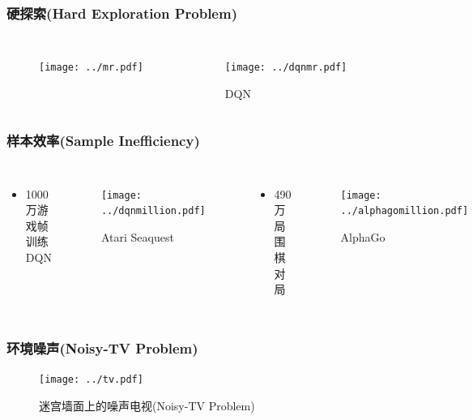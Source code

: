 \documentclass{beamer}
\begin{document}
\begin{CJK*}{GBK}{hei}
\begin{frame}\frametitle{硬探索(Hard Exploration Problem)}

\begin{columns}
    \begin{figure}[htbp]
        \centering\texttt{[image: ../mr.pdf]}
    \end{figure}
    \begin{figure}[htbp]
        \centering\texttt{[image: ../dqnmr.pdf]}
        \caption{DQN\citep{Mnih2015HumanlevelCT}}
    \end{figure}
\end{columns}
\end{frame}

\begin{frame}\frametitle{样本效率(Sample Inefficiency)}
\begin{columns}
    \begin{itemize}
        \item 1000万游戏帧训练DQN
    \end{itemize}
    \begin{figure}[htbp]
        \centering\texttt{[image: ../dqnmillion.pdf]}
	\caption{Atari Seaquest\citep{Mnih2015HumanlevelCT}}
    \end{figure}
    \begin{itemize}
        \item 490万局围棋对局
    \end{itemize}
    \begin{figure}[htbp]
        \centering\texttt{[image: ../alphagomillion.pdf]}
	\caption{AlphaGo\citep{Silver2017MasteringTG}}
    \end{figure}
\end{columns}
\end{frame}

\begin{frame}\frametitle{环境噪声(Noisy-TV Problem)}
    \begin{figure}[htbp]
        \centering\texttt{[image: ../tv.pdf]}
	\caption{迷宫墙面上的噪声电视(Noisy-TV Problem)\citep{Burda2019ExplorationBR}}
    \end{figure}
\end{frame}


\end{CJK*}
\end{document}
